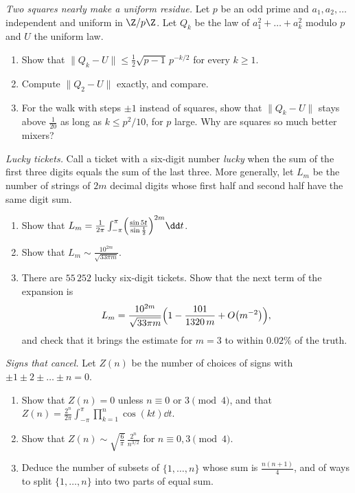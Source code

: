 \begin{exercise}[$\star$]\label{pb:squaresmodp}
\emph{Two squares nearly make a uniform residue.} Let $p$ be an odd prime and $a_1,a_2,\dots$ independent and uniform in $\Z/p\Z$. Let $Q_k$ be the law of
$a_1^2+\dots+a_k^2$ modulo $p$ and $U$ the uniform law.
\begin{enumerate}[label=(\alph*)]
\item Show that $\|Q_k-U\|\le\frac12\sqrt{p-1}\,p^{-k/2}$ for every $k\ge1$.
\item Compute $\|Q_2-U\|$ exactly, and compare.
\item For the walk with steps $\pm1$ instead of squares, show that $\|Q_k-U\|$ stays above $\frac1{20}$ as long as $k\le p^2/10$, for $p$ large. Why are squares so
much better mixers?
\end{enumerate}
\end{exercise}

\begin{exercise}[$\star\star$]\label{pb:lucky}
\emph{Lucky tickets.} Call a ticket with a six-digit number \emph{lucky} when the sum of the first three digits
equals the sum of the last three. More generally, let $L_m$ be the number of strings of $2m$ decimal digits whose first half and second half have the same digit sum.
\begin{enumerate}[label=(\alph*)]
\item Show that $L_m=\frac1{2\pi}\int_{-\pi}^\pi\Bigl(\frac{\sin5t}{\sin\frac t2}\Bigr)^{2m}\dd t$.
\item Show that $L_m\sim\frac{10^{2m}}{\sqrt{33\pi m}}$.
\item There are $55\,252$ lucky six-digit tickets. Show that the next term of the expansion is
\[
L_m=\frac{10^{2m}}{\sqrt{33\pi m}}\Bigl(1-\frac{101}{1320\,m}+O\bigl(m^{-2}\bigr)\Bigr),
\]
and check that it brings the estimate for $m=3$ to within $0.02\%$ of the truth.
\end{enumerate}
\end{exercise}

\begin{exercise}[$\star\star\star$]\label{pb:signedsums}
\emph{Signs that cancel.} Let $Z(n)$ be the number of choices of signs with $\pm1\pm2\pm\dots\pm n=0$.
\begin{enumerate}[label=(\alph*)]
\item Show that $Z(n)=0$ unless $n\equiv0$ or $3\pmod4$, and that $Z(n)=\frac{2^n}{2\pi}\int_{-\pi}^\pi\prod_{k=1}^n\cos(kt)\dd t$.
\item Show that $Z(n)\sim\sqrt{\frac6\pi}\,\frac{2^n}{n^{3/2}}$ for $n\equiv0,3\pmod4$.
\item Deduce the number of subsets of $\{1,\dots,n\}$ whose sum is $\frac{n(n+1)}4$, and of ways to split $\{1,\dots,n\}$ into two parts of equal sum.
\end{enumerate}
\end{exercise}

